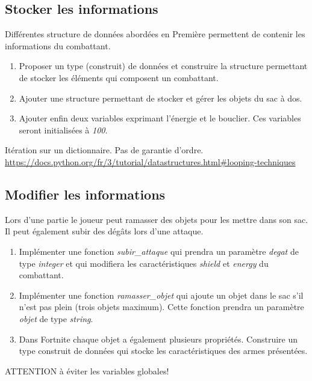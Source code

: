 \documentclass[a4paper,11pt]{article}
\begin{document}
\begin{Form}
\subsection{Stocker les informations}
Différentes structure de données abordées en Première permettent de contenir les informations du combattant.
\begin{activite}
\begin{enumerate}
\item Proposer un type (construit) de données et construire la structure permettant de stocker les éléments qui composent un combattant.
\item Ajouter une structure permettant de stocker et gérer les objets du sac à dos.
\item Ajouter enfin deux variables exprimant l'énergie et le bouclier. Ces variables seront initialisées à \emph{100}.
\end{enumerate} 
\end{activite}
\begin{commentprof}
Itération sur un dictionnaire. Pas de garantie d'ordre.\\\url{https://docs.python.org/fr/3/tutorial/datastructures.html#looping-techniques}
\end{commentprof}
\subsection{Modifier les informations}
Lors d'une partie le joueur peut ramasser des objets pour les mettre dans son sac. Il peut également subir des dégâts lors d'une attaque.
\begin{activite}
\begin{enumerate}
\item Implémenter une fonction \emph{subir\_attaque} qui prendra un paramètre \emph{degat} de type \emph{integer} et qui modifiera les caractéristiques \emph{shield} et \emph{energy} du combattant. 
\item Implémenter une fonction \emph{ramasser\_objet} qui ajoute un objet dans le sac s'il n'est pas plein (trois objets maximum). Cette fonction prendra un paramètre \emph{objet} de type \emph{string}.
\item Dans Fortnite chaque objet a également plusieurs propriétés. Construire un type construit de données qui stocke les caractéristiques des armes présentées.
\end{enumerate}
\end{activite}
\begin{commentprof}
ATTENTION à éviter les variables globales!
\end{commentprof}
\begin{commentprof}

\end{commentprof}
\end{Form}
\end{document}

